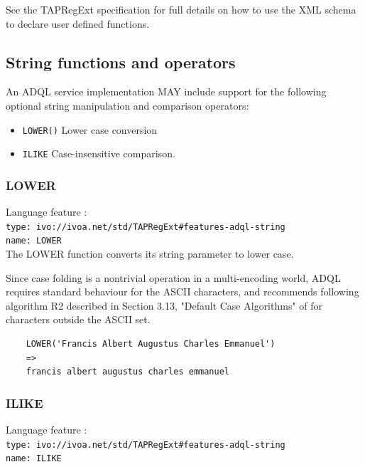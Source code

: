\documentclass[11pt,a4paper]{ivoa}
\newcommand{\TAPRegExtSpec}{TAPRegExt specification\xspace}
\begin{document}
See the \TAPRegExtSpec for full details on how to use the
XML schema to declare user defined functions.

\subsection{String functions and operators}
\label{sec:string.functions}

An ADQL service implementation MAY include support for the following optional
string manipulation and comparison operators:

\begin{itemize}
    \item \verb:LOWER(): Lower case conversion
    \item \verb:ILIKE: Case-insensitive comparison.
\end{itemize}

\subsubsection{LOWER}
\label{sec:string.functions.lower}
{\footnotesize Language feature :}\\
{\footnotesize \verb|type: ivo://ivoa.net/std/TAPRegExt#features-adql-string|}\\
{\footnotesize \verb|name: LOWER|}\\

The LOWER function converts its string parameter to lower case.

Since case folding is a nontrivial operation in a multi-encoding world,
ADQL requires standard behaviour for the ASCII characters, and recommends
following algorithm R2 described in Section 3.13, "Default Case Algorithms"
of \citet{std:UNICODE} for characters outside the ASCII set.

\begin{verbatim}
    LOWER('Francis Albert Augustus Charles Emmanuel')
    =>
    francis albert augustus charles emmanuel
\end{verbatim}

\subsubsection{ILIKE}
\label{sec:string.functions.ilike}
{\footnotesize Language feature :}\\
{\footnotesize \verb|type: ivo://ivoa.net/std/TAPRegExt#features-adql-string|}\\
{\footnotesize \verb|name: ILIKE|}\\
\end{document}
